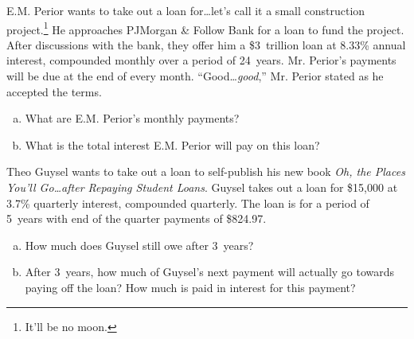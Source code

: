 \documentclass[11pt,letterpaper]{article}
\begin{document}

 E.M. Perior wants to take out a loan for\dots let's call it a small construction project.\footnote{It'll be no moon.} He approaches PJMorgan \& Follow Bank for a loan to fund the project. After discussions with the bank, they offer him a \$3~trillion loan at 8.33\% annual interest, compounded monthly over a period of 24~years. Mr. Perior's payments will be due at the end of every month. ``Good\dots \textit{good},'' Mr. Perior stated as he accepted the terms. 
	\begin{enumerate}[(a)]
	\item What are E.M. Perior's monthly payments?
	\item What is the total interest E.M. Perior will pay on this loan?
	\end{enumerate}



\newpage



 Theo Guysel wants to take out a loan to self-publish his new book \textit{Oh, the Places You'll Go\dots after Repaying Student Loans}. Guysel takes out a loan for \$15,000 at 3.7\% quarterly interest, compounded quarterly. The loan is for a period of 5~years with end of the quarter payments of \$824.97.
	\begin{enumerate}[(a)]
	\item How much does Guysel still owe after 3~years?
	\item After 3~years, how much of Guysel's next payment will actually go towards paying off the loan? How much is paid in interest for this payment?
	\end{enumerate}
\end{document}
